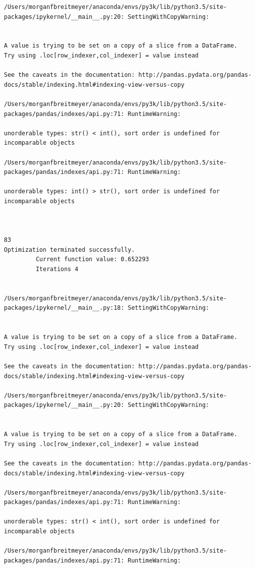 \begin{lstlisting}
/Users/morganfbreitmeyer/anaconda/envs/py3k/lib/python3.5/site-packages/ipykernel/__main__.py:20: SettingWithCopyWarning:


A value is trying to be set on a copy of a slice from a DataFrame.
Try using .loc[row_indexer,col_indexer] = value instead

See the caveats in the documentation: http://pandas.pydata.org/pandas-docs/stable/indexing.html#indexing-view-versus-copy

/Users/morganfbreitmeyer/anaconda/envs/py3k/lib/python3.5/site-packages/pandas/indexes/api.py:71: RuntimeWarning:

unorderable types: str() < int(), sort order is undefined for incomparable objects

/Users/morganfbreitmeyer/anaconda/envs/py3k/lib/python3.5/site-packages/pandas/indexes/api.py:71: RuntimeWarning:

unorderable types: int() > str(), sort order is undefined for incomparable objects



83
Optimization terminated successfully.
         Current function value: 0.652293
         Iterations 4


/Users/morganfbreitmeyer/anaconda/envs/py3k/lib/python3.5/site-packages/ipykernel/__main__.py:18: SettingWithCopyWarning:


A value is trying to be set on a copy of a slice from a DataFrame.
Try using .loc[row_indexer,col_indexer] = value instead

See the caveats in the documentation: http://pandas.pydata.org/pandas-docs/stable/indexing.html#indexing-view-versus-copy

/Users/morganfbreitmeyer/anaconda/envs/py3k/lib/python3.5/site-packages/ipykernel/__main__.py:20: SettingWithCopyWarning:


A value is trying to be set on a copy of a slice from a DataFrame.
Try using .loc[row_indexer,col_indexer] = value instead

See the caveats in the documentation: http://pandas.pydata.org/pandas-docs/stable/indexing.html#indexing-view-versus-copy

/Users/morganfbreitmeyer/anaconda/envs/py3k/lib/python3.5/site-packages/pandas/indexes/api.py:71: RuntimeWarning:

unorderable types: str() < int(), sort order is undefined for incomparable objects

/Users/morganfbreitmeyer/anaconda/envs/py3k/lib/python3.5/site-packages/pandas/indexes/api.py:71: RuntimeWarning:


\end{lstlisting}
